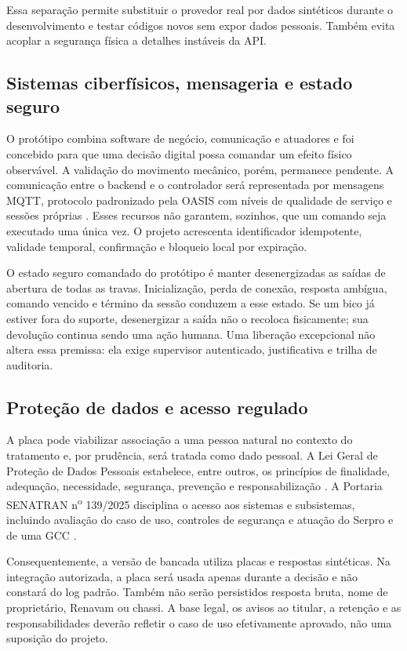 Essa separação permite substituir o provedor real por dados sintéticos durante
o desenvolvimento e testar códigos novos sem expor dados pessoais. Também evita
acoplar a segurança física a detalhes instáveis da API.

\subsection{Sistemas ciberfísicos, mensageria e estado seguro}

O protótipo combina software de negócio, comunicação e atuadores e foi concebido
para que uma decisão digital possa comandar um efeito físico observável. A
validação do movimento mecânico, porém, permanece pendente. A comunicação entre o backend
e o controlador será representada por mensagens MQTT, protocolo padronizado pela
OASIS com níveis de qualidade de serviço e sessões próprias
\cite{oasisMqtt2019}. Esses recursos não garantem, sozinhos, que um comando seja
executado uma única vez. O projeto acrescenta identificador idempotente,
validade temporal, confirmação e bloqueio local por expiração.

O estado seguro comandado do protótipo é manter desenergizadas as saídas de
abertura de todas as travas. Inicialização, perda de conexão, resposta ambígua,
comando vencido e término da sessão conduzem a esse estado. Se um bico já
estiver fora do suporte, desenergizar a saída não o recoloca fisicamente; sua
devolução continua sendo uma ação humana. Uma liberação excepcional não altera
essa premissa: ela exige supervisor autenticado, justificativa e trilha de
auditoria.

\subsection{Proteção de dados e acesso regulado}

A placa pode viabilizar associação a uma pessoa natural no contexto do
tratamento e, por prudência, será tratada como dado pessoal. A Lei Geral de
Proteção de Dados Pessoais estabelece, entre outros, os princípios de finalidade,
adequação, necessidade, segurança, prevenção e responsabilização
\cite{lgpd2018}. A Portaria SENATRAN n\textsuperscript{o} 139/2025 disciplina o acesso aos sistemas
e subsistemas, incluindo avaliação do caso de uso, controles de segurança e
atuação do Serpro e de uma GCC \cite{senatran1392025}.

Consequentemente, a versão de bancada utiliza placas e respostas sintéticas.
Na integração autorizada, a placa será usada apenas durante a decisão e não
constará do log padrão. Também não serão persistidos resposta bruta, nome de
proprietário, Renavam ou chassi. A base legal, os avisos ao titular, a retenção e
as responsabilidades deverão refletir o caso de uso efetivamente aprovado, não
uma suposição do projeto.

